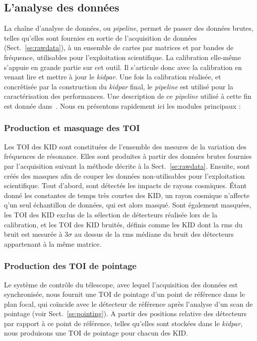 \subsection{L'analyse des données}
\label{se:overview_pipeline}

La chaîne d'analyse de données, ou \emph{pipeline}, permet de passer
des données brutes, telles qu'elles sont fournies en sortie de
l'acquisition de données (Sect.~\ref{se:rawdata}), à un ensemble de
cartes par matrices et par bandes de fréquence, utilisables pour
l'exploitation scientifique. La calibration elle-même s'appuie en
grande partie sur cet outil. Il s'articule donc avec la calibration en
venant lire et mettre à jour le \emph{kidpar}. Une fois la calibration
réalisée, et concrêtisée par la construction du \emph{kidpar} final,
le \emph{pipeline} est utilisé pour la caractérisation des
performances. Une description de ce \emph{pipeline} utilisé à cette
fin est donnée dans~\citet{Perotto2019}. Nous en présentons rapidement
ici les modules principaux :

\subsubsection{Production et masquage des TOI}
Les TOI des KID sont constituées de l'ensemble des mesures de la
variation des fréquences de résonance. Elles sont produites à partir
des données brutes fournies par l'acquisition suivant la méthode
décrite à la Sect.~\ref{se:rawdata}. Ensuite, sont créés des masques
afin de couper les données non-utilisables pour l'exploitation
scientifique. Tout d'abord, sont détectés les impacts de rayons
cosmiques. \'Etant donné les constantes de temps très courtes des
KID, un rayon cosmique n'affecte q'un seul échantillon de données,
qui est alors masqué. Sont également masquées, les TOI des KID exclus
de la sélection de détecteurs réalisée lors de la calibration, et
les TOI des KID bruités, définis comme les KID dont la rms du bruit
est mesurée à 3$\sigma$ au dessus de la rms médiane du bruit des
détecteurs appartenant à la même matrice.

\subsubsection{Production des TOI de pointage} Le système de contrôle du
télescope, avec lequel l'acquisition des données est synchronisée,
nous fournit une TOI de pointage d'un point de référence dans le
plan focal, qui coïncide avec le détecteur de référence après
l'analyse d'un scan de pointage (voir Sect.~\ref{se:pointing}). A
partir des positions relative des détecteurs par rapport à ce point
de référence, telles qu'elles sont stockées dans le \emph{kidpar},
nous produisons une TOI de pointage pour chacun des KID.

